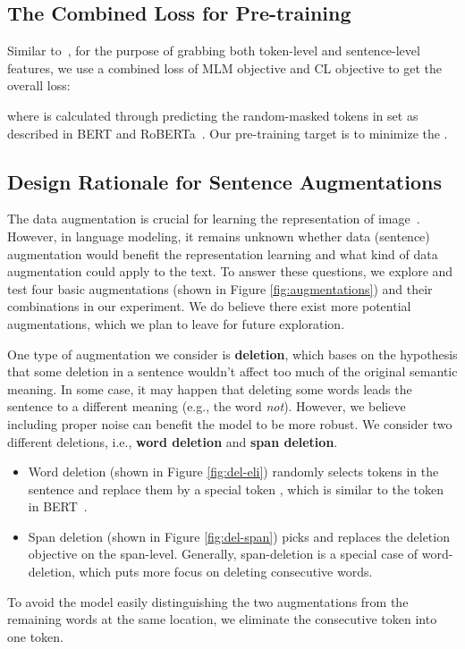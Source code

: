 \documentclass[11pt,a4paper]{article}
\begin{document}
\subsection{The Combined Loss for Pre-training} \label{3_2}
Similar to~\cite{giorgi2020declutr}, for the purpose of grabbing both token-level and sentence-level features, we use a combined loss of MLM objective and CL objective to get the overall loss:

where  is calculated through predicting the random-masked tokens in set  as described in BERT and RoBERTa~\cite{devlin2019bert, liu2019roberta}. Our pre-training target is to minimize the .

\subsection{Design Rationale for Sentence Augmentations} 
\label{3_3}
The data augmentation is crucial for learning the representation of image~\cite{tian2019contrastive, jain2020contrastive}. However, in language modeling, it remains unknown whether data (sentence) augmentation would benefit the representation learning and what kind of data augmentation could apply to the text. 
To answer these questions, we explore and test four basic augmentations (shown in Figure \ref{fig:augmentations}) and their combinations in our experiment. We do believe there exist more potential augmentations, which we plan to leave for future exploration. 

One type of augmentation we consider is \textbf{deletion}, which bases on the hypothesis that some deletion in a sentence wouldn't affect too much of the original semantic meaning. In some case, it may happen that deleting some words leads the sentence to a different meaning (e.g., the word \textit{not}). However, we believe including proper noise can benefit the model to be more robust. We consider two different deletions, i.e., \textbf{word deletion} and \textbf{span deletion}. 
\begin{itemize}
    \item Word deletion (shown in Figure \ref{fig:del-eli}) randomly selects tokens in the sentence and replace them by a special token , which is similar to the token  in BERT~\cite{devlin2019bert}.
    \item Span deletion (shown in Figure \ref{fig:del-span}) picks and replaces the deletion objective on the span-level. Generally, span-deletion is a special case of word-deletion, which puts more focus on deleting consecutive words.
\end{itemize}
To avoid the model easily distinguishing the two augmentations from the remaining words at the same location, we eliminate the consecutive token  into one token. 
\end{document}
